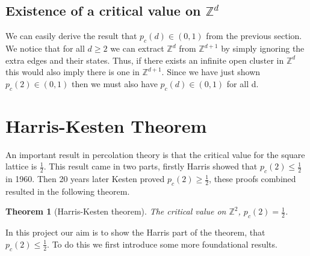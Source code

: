 \documentclass[a4paper,11pt]{article}
\newtheorem{theorem}{Theorem}[section]
\theoremstyle{definition}
\newcommand{\ints}{\mathbb{Z}}
\begin{document}
\subsection {Existence of a critical value on $\ints^d$}
We can easily derive the result that $p_c(d)\in (0,1)$ from the previous section. 
We notice that for all $d\geq 2$ we can extract $\ints^d$ from $\ints^{d+1}$ by simply ignoring the extra edges and their states.
Thus, if there exists an infinite open cluster in $\ints^d$ this would also imply there is one in $\ints^{d+1}$.
Since we have just shown $p_c(2) \in (0,1)$ then we must also have $p_c(d) \in (0,1)$ for all d.

{\color{red}{TODO: explain critical value is non-decreasing in d, by coupling argument?}}


\section{Harris-Kesten Theorem}
An important result in percolation theory is that the critical value for the square lattice is $\frac{1}{2}$. 
This result came in two parts, firstly Harris \cite{harris_1960} showed that $p_c(2) \leq \frac{1}{2}$ in 1960.
Then 20 years later Kesten \cite{kesten1980critical} proved $p_c(2) \geq \frac{1}{2}$, these proofs combined resulted in the following theorem.

\begin{theorem}[Harris-Kesten theorem]
	The critical value on $\ints^2$,  $p_c(2) =  \frac{1}{2}$.
\end{theorem}
In this project our aim is to show the Harris part of the theorem, that $p_c(2) \leq \frac{1}{2}$. 
To do this we first introduce some more foundational results.\\
\end{document}
